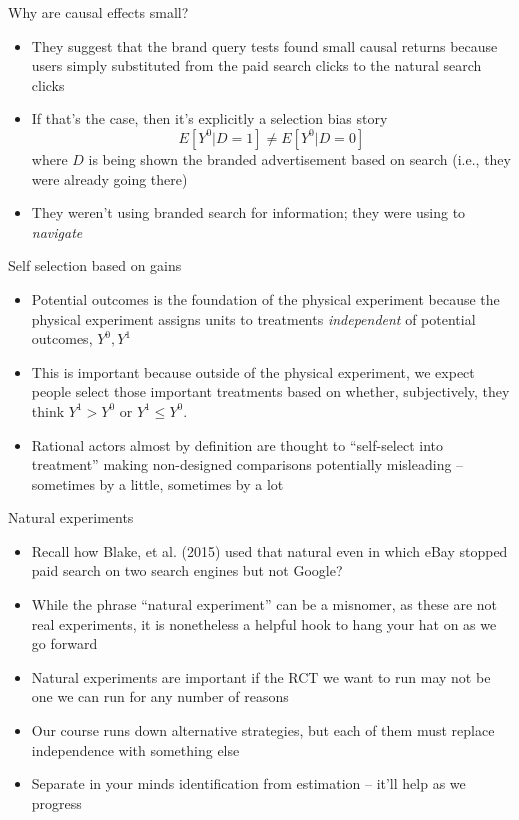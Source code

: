 \documentclass{beamer}
\begin{document}
\begin{frame}{Why are causal effects small?}

  \begin{itemize}
    \item They suggest that the brand query tests found small causal returns because users simply substituted from the paid search clicks to the natural search clicks
    \item If that's the case, then it's explicitly a selection bias story $$E[Y^0|D=1] \neq E[Y^0|D=0]$$ where $D$ is being shown the branded advertisement based on search (i.e., they were already going there)
    \item They weren't using branded search for information; they were using to \emph{navigate}
  \end{itemize}

\end{frame}


\begin{frame}{Self selection based on gains}

  \begin{itemize}
    \item Potential outcomes is the foundation of the physical experiment because the physical experiment assigns units to treatments \emph{independent} of potential outcomes, $Y^0,Y^1$
    \item This is important because outside of the physical experiment, we expect people select those important treatments based on whether, subjectively, they think $Y^1>Y^0$ or $Y^1\leq Y^0$.
    \item Rational actors almost by definition are thought to ``self-select into treatment'' making non-designed comparisons potentially misleading -- sometimes by a little, sometimes by a lot
  \end{itemize}

\end{frame}

\begin{frame}{Natural experiments}

  \begin{itemize}
    \item Recall how Blake, et al. (2015) used that natural even in which eBay stopped paid search on two search engines but not Google?
    \item While the phrase ``natural experiment'' can be a misnomer, as these are not real experiments, it is nonetheless a helpful hook to hang your hat on as we go forward
    \item Natural experiments are important if the RCT we want to run may not be one we can run for any number of reasons
    \item Our course runs down alternative strategies, but each of them must replace independence with something else
    \item Separate in your minds identification from estimation -- it'll help as we progress
  \end{itemize}

\end{frame}
\end{document}

